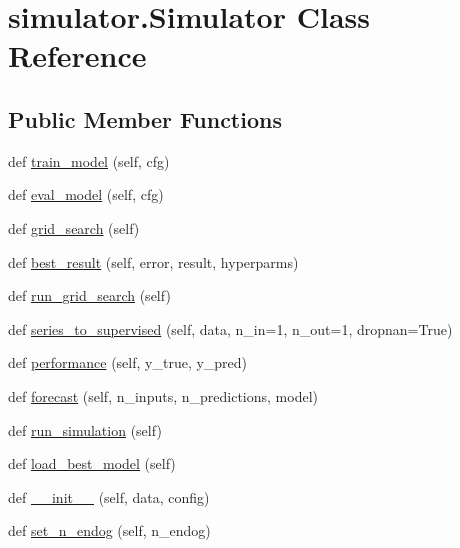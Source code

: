 \hypertarget{classsimulator_1_1Simulator}{}\section{simulator.\+Simulator Class Reference}
\label{classsimulator_1_1Simulator}
\subsection*{Public Member Functions}
\begin{DoxyCompactItemize}
\item 
def \hyperlink{classsimulator_1_1Simulator_a6fd0ae4f2ef9932a555ffa1d46396e32}{train\+\_\+model} (self, cfg)
\item 
def \hyperlink{classsimulator_1_1Simulator_a58894faf1432a59b07a8a43af838bc9e}{eval\+\_\+model} (self, cfg)
\item 
def \hyperlink{classsimulator_1_1Simulator_a078e62ee729b120598da1c1c057a0884}{grid\+\_\+search} (self)
\item 
def \hyperlink{classsimulator_1_1Simulator_aea3c3b69d35a9a81fb0f01548f000a99}{best\+\_\+result} (self, error, result, hyperparms)
\item 
def \hyperlink{classsimulator_1_1Simulator_ab35b39d33345b7da4bc856a1b9d81a0a}{run\+\_\+grid\+\_\+search} (self)
\item 
def \hyperlink{classsimulator_1_1Simulator_aac4274501be3a4b0f9f2102704d9e866}{series\+\_\+to\+\_\+supervised} (self, data, n\+\_\+in=1, n\+\_\+out=1, dropnan=True)
\item 
def \hyperlink{classsimulator_1_1Simulator_a95328cad714d6390b8ef6eedb20b33c7}{performance} (self, y\+\_\+true, y\+\_\+pred)
\item 
def \hyperlink{classsimulator_1_1Simulator_ae83357e0a55faafa36c89566cd4cc07f}{forecast} (self, n\+\_\+inputs, n\+\_\+predictions, model)
\item 
def \hyperlink{classsimulator_1_1Simulator_ae52bd7608ecf01ac5e426e8491d9ec44}{run\+\_\+simulation} (self)
\item 
def \hyperlink{classsimulator_1_1Simulator_a9c33239232dc29a9a084fb57d5b8baa5}{load\+\_\+best\+\_\+model} (self)
\item 
def \hyperlink{classsimulator_1_1Simulator_a0f2191dc72d6be5f4e049081940bfe46}{\+\_\+\+\_\+init\+\_\+\+\_\+} (self, data, config)
\item 
def \hyperlink{classsimulator_1_1Simulator_a3ac8ba88f547844185800ee333e99bde}{set\+\_\+n\+\_\+endog} (self, n\+\_\+endog)

\end{DoxyCompactItemize}
